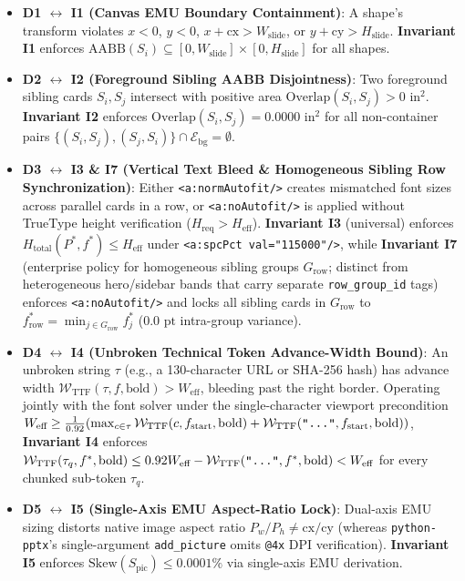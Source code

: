 \documentclass[10pt,journal,compsoc]{IEEEtran}
\begin{document}
\begin{itemize}
    \item \textbf{D1 $\leftrightarrow$ I1 (Canvas EMU Boundary Containment)}: A shape's transform violates $x < 0$, $y < 0$, $x + \text{cx} > W_{\text{slide}}$, or $y + \text{cy} > H_{\text{slide}}$. \textbf{Invariant I1} enforces $\text{AABB}(S_i) \subseteq [0, W_{\text{slide}}] \times [0, H_{\text{slide}}]$ for all shapes.
    \item \textbf{D2 $\leftrightarrow$ I2 (Foreground Sibling AABB Disjointness)}: Two foreground sibling cards $S_i, S_j$ intersect with positive area $\text{Overlap}(S_i, S_j) > 0\text{ in}^2$. \textbf{Invariant I2} enforces $\text{Overlap}(S_i, S_j) = 0.0000\text{ in}^2$ for all non-container pairs $\{(S_i, S_j), (S_j, S_i)\} \cap \mathcal{E}_{\text{bg}} = \emptyset$.
    \item \textbf{D3 $\leftrightarrow$ I3 \& I7 (Vertical Text Bleed \& Homogeneous Sibling Row Synchronization)}: Either \texttt{<a:normAutofit/>} creates mismatched font sizes across parallel cards in a row, or \texttt{<a:noAutofit/>} is applied without TrueType height verification ($H_{\text{req}} > H_{\text{eff}}$). \textbf{Invariant I3} (universal) enforces $H_{\text{total}}(P^*, f^*) \le H_{\text{eff}}$ under \texttt{<a:spcPct val="115000"/>}, while \textbf{Invariant I7} (enterprise policy for homogeneous sibling groups $G_{\text{row}}$; distinct from heterogeneous hero/sidebar bands that carry separate \texttt{row\_group\_id} tags) enforces \texttt{<a:noAutofit/>} and locks all sibling cards in $G_{\text{row}}$ to $f^*_{\text{row}} = \min_{j \in G_{\text{row}}} f^*_j$ ($0.0\text{ pt}$ intra-group variance).
    \item \textbf{D4 $\leftrightarrow$ I4 (Unbroken Technical Token Advance-Width Bound)}: An unbroken string $\tau$ (e.g., a 130-character URL or SHA-256 hash) has advance width $\mathcal{W}_{\text{TTF}}(\tau, f, \text{bold}) > W_{\text{eff}}$, bleeding past the right border. Operating jointly with the font solver under the single-character viewport precondition $W_{\text{eff}} \ge \frac{1}{0.92}(\max_{c \in \tau} \mathcal{W}_{\text{TTF}}(c, f_{\text{start}}, \text{bold}) + \mathcal{W}_{\text{TTF}}(\text{\texttt{"..."}}, f_{\text{start}}, \text{bold}))$, \textbf{Invariant I4} enforces $\mathcal{W}_{\text{TTF}}(\tau_q, f^*, \text{bold}) \le 0.92 W_{\text{eff}} - \mathcal{W}_{\text{TTF}}(\text{\texttt{"..."}}, f^*, \text{bold}) < W_{\text{eff}}$ for every chunked sub-token $\tau_q$.
    \item \textbf{D5 $\leftrightarrow$ I5 (Single-Axis EMU Aspect-Ratio Lock)}: Dual-axis EMU sizing distorts native image aspect ratio $P_w / P_h \ne \text{cx} / \text{cy}$ (whereas \texttt{python-pptx}'s single-argument \texttt{add\_picture} omits \texttt{@4x} DPI verification). \textbf{Invariant I5} enforces $\text{Skew}(S_{\text{pic}}) \le 0.0001\%$ via single-axis EMU derivation.

\end{itemize}
\end{document}
